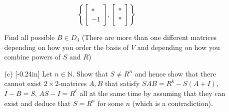 \documentclass[letterpaper,12pt]{article}
\newcommand{\set}[1]{\left\{ #1 \right\}}
\theoremstyle{definition}
\begin{document}
   $$\set{\begin{bmatrix}
      * \\ -1
   \end{bmatrix},\begin{bmatrix}
      * \\ *
   \end{bmatrix}}$$
   \begin{enumerate} 
   \item[] \begin{enumerate} 
   \item[] Find all possible $B \in D_4$ (There are more than one different matrices depending on how you order the basis of $V$ and depending on how you combine powers of $S$ and $R$)
    \vspace{4in}
\end{enumerate}
\end{enumerate}
\pagebreak
\begin{enumerate}
    \item[] \begin{enumerate}
        \item[(c)]\reversemarginpar{}[-0.24in]  Let $n \in \mathbb{N}$. Show that $S \neq R^n$ and hence show that there cannot exist $2\times 2$-matrices $A,B$ that satisfy $SAB = R^k -S(A+I)$, $I-B = S$, $AS-I=R^\ell$ all at the same time by assuming that they can exist and deduce that $S = R^n$ for some $n$ (which is a contradiction). 
    \end{enumerate}
\end{enumerate}
\end{document}

